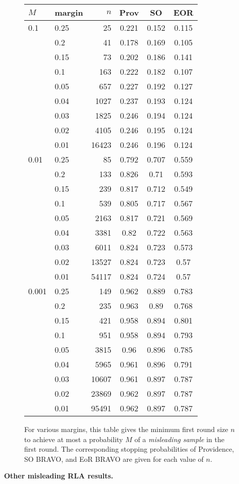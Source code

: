 \begin{figure}
\begin{tabular}{ |l|l|r|c|c|c| }
\hline
$M$ & margin & $n$ & Prov & SO & EOR \\
\hline
0.1&0.25&25&0.221&0.152&0.115\\
&0.2&41&0.178&0.169&0.105\\
&0.15&73&0.202&0.186&0.141\\
&0.1&163&0.222&0.182&0.107\\
&0.05&657&0.227&0.192&0.127\\
&0.04&1027&0.237&0.193&0.124\\
&0.03&1825&0.246&0.194&0.124\\
&0.02&4105&0.246&0.195&0.124\\
&0.01&16423&0.246&0.196&0.124\\
\hline
0.01&0.25&85&0.792&0.707&0.559\\
&0.2&133&0.826&0.71&0.593\\
&0.15&239&0.817&0.712&0.549\\
&0.1&539&0.805&0.717&0.567\\
&0.05&2163&0.817&0.721&0.569\\
&0.04&3381&0.82&0.722&0.563\\
&0.03&6011&0.824&0.723&0.573\\
&0.02&13527&0.824&0.723&0.57\\
&0.01&54117&0.824&0.724&0.57\\
\hline
0.001&0.25&149&0.962&0.889&0.783\\
&0.2&235&0.963&0.89&0.768\\
&0.15&421&0.958&0.894&0.801\\
&0.1&951&0.958&0.894&0.793\\
&0.05&3815&0.96&0.896&0.785\\
&0.04&5965&0.961&0.896&0.791\\
&0.03&10607&0.961&0.897&0.787\\
&0.02&23869&0.962&0.897&0.787\\
&0.01&95491&0.962&0.897&0.787\\
\hline
\end{tabular}
\caption{For various margins, this table gives the minimum first round size $n$ to achieve at most a probability $M$ of a \emph{misleading sample} in the first round. The corresponding stopping probabilities of Providence, SO BRAVO, and EoR BRAVO are given for each value of $n$.}
\label{fig:misleading}
\end{figure}



\textbf{Other misleading RLA results.}





